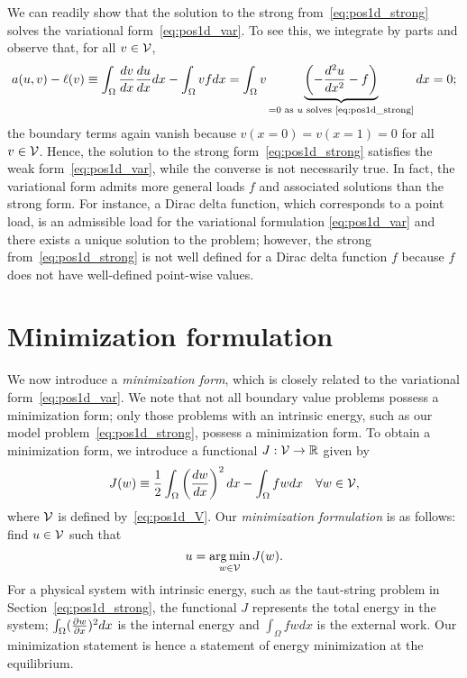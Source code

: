 We can readily show that the solution to the strong from~\eqref{eq:pos1d_strong} solves the variational form~\eqref{eq:pos1d_var}.  To see this, we integrate by parts and observe that, for all $v \in \mathcal{V}$,
\begin{equation*}
  a(u,v) - \ell(v) \equiv
  \int_{\Omega} \frac{d v}{d x} \frac{d u}{d x} dx - \int_\Omega vf dx
  =
  \int_\Omega v  \underbrace{ \left( -\frac{d ^2u}{d x^2} - f \right) }_{= 0 \text{ as $u$ solves \eqref{eq:pos1d_strong}}}  dx  = 0 ;
\end{equation*}
the boundary terms again vanish because $v(x=0) = v(x=1) = 0$ for all $v \in \mathcal{V}$. Hence, the solution to the strong form~\eqref{eq:pos1d_strong} satisfies the weak form~\eqref{eq:pos1d_var}, while the converse is not necessarily true.  In fact, the variational form admits more general loads $f$ and associated solutions than the strong form.  For instance, a Dirac delta function, which corresponds to a point load, is an admissible load for the variational formulation \eqref{eq:pos1d_var} and there exists a unique solution to the problem; however, the strong from~\eqref{eq:pos1d_strong} is not well defined for a Dirac delta function $f$ because $f$ does not have well-defined point-wise values. 

\section{Minimization formulation}
\label{sec:pos1d_min}
We now introduce a \emph{minimization form}, which is closely related to the variational form~\eqref{eq:pos1d_var}. We note that not all boundary value problems possess a minimization form; only those problems with an intrinsic energy, such as our model problem~\eqref{eq:pos1d_strong}, possess a minimization form. To obtain a minimization form, we introduce a functional $J: \mathcal{V} \to \mathbb{R}$ given by
\begin{equation}
  J(w) \equiv \frac{1}{2} \int_\Omega \left( \frac{d w}{d x} \right)^2 dx - \int_\Omega f w dx \quad \forall w \in \mathcal{V},
  \label{eq:pos1d_J}
\end{equation}
where $\mathcal{V}$ is defined by~\eqref{eq:pos1d_V}. Our \emph{minimization formulation} is as follows: find $u \in \mathcal{V}$ such that
\begin{equation}
  u = \operatorname*{arg\,min}_{w \in \mathcal{V}} J(w).
  \label{eq:pos1d_min}
\end{equation}
For a physical system with intrinsic energy, such as the taut-string problem in Section~\ref{eq:pos1d_strong}, the functional $J$ represents the total energy in the system; $\int_\Omega (\frac{\partial w}{\partial x})^2 dx$ is the internal energy and $\int_\Omega f w dx$ is the external work.  Our minimization statement is hence a statement of energy minimization at the equilibrium. 

